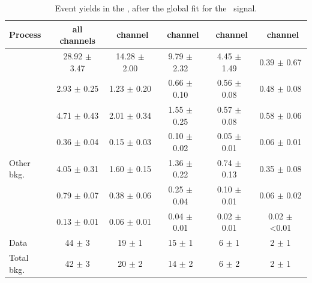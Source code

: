 \begin{table}[htbp]
	\centering
	\caption{Event yields in the \TTCR, after the global fit for the \Zut\ signal. }
	
	\begin{tabular} {l c c c c c }
		\toprule
		Process &   all channels & \mumumu\ channel & \emumu\ channel & \eemu\ channel &\eee\ channel \\
		\midrule
		\NPL\ \ttbar& 28.92 $ \pm $ 3.47 & 14.28 $\pm$ 2.00 &  9.79 $\pm$ 2.32 & 4.45 $\pm$ 1.49 & 0.39 $\pm$ 0.67 \\ 
		\ttZ 		&  2.93 $ \pm $ 0.25 &  1.23 $\pm$ 0.20 &  0.66 $\pm$ 0.10 & 0.56 $\pm$ 0.08 & 0.48 $\pm$ 0.08 \\ 
		\WZ			&  4.71 $ \pm $ 0.43 &  2.01 $\pm$ 0.34 &  1.55 $\pm$ 0.25 & 0.57 $\pm$ 0.08 & 0.58 $\pm$ 0.06 \\ 
		\ZZ 		&  0.36 $ \pm $ 0.04 &  0.15 $\pm$ 0.03 &  0.10 $\pm$ 0.02 & 0.05 $\pm$ 0.01 & 0.06 $\pm$ 0.01 \\ 
		Other bkg. 	&  4.05 $ \pm $ 0.31 &  1.60 $\pm$ 0.15 &  1.36 $\pm$ 0.22 & 0.74 $\pm$ 0.13 & 0.35 $\pm$ 0.08 \\ 
		\tZq 		&  0.79 $ \pm $ 0.07 &  0.38 $\pm$ 0.06 &  0.25 $\pm$ 0.04 & 0.10 $\pm$ 0.01 & 0.06 $\pm$ 0.02 \B\\ 
		\kZut  		&  0.13 $ \pm $ 0.01 &  0.06 $\pm$ 0.01 &  0.04 $\pm$ 0.01 & 0.02 $\pm$ 0.01 & 0.02 $\pm$ <0.01  \T\B\\
		\hdashline
		Data 		& 44 $ \pm $ 3 & 19 $\pm$ 1 & 15 $\pm$ 1 & 6 $\pm$ 1 & 2 $\pm$ 1 \T\\
		Total bkg.	& 42 $ \pm $ 3 & 20 $\pm$ 2 & 14 $\pm$ 2 & 6 $\pm$ 2 & 2 $\pm$ 1\\
		\bottomrule
	\end{tabular}
	\label{tab:PYieldTTCR}
\end{table}

